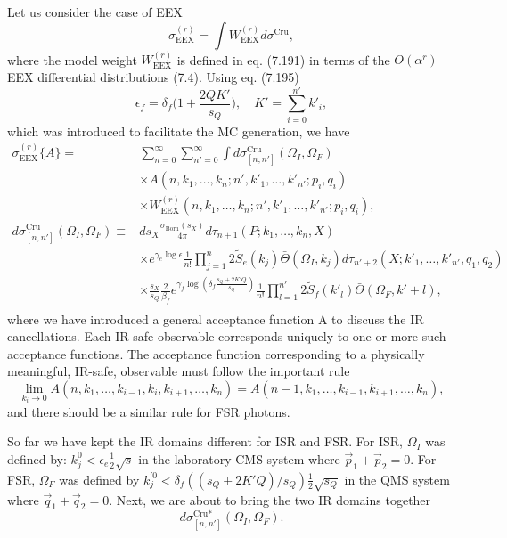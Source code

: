 Let us consider the case of EEX 
\begin{equation}
\sigma^{(r)}_\text{EEX}=\int W^{(r)}_\text{EEX}d\sigma^\text{Cru},
\end{equation}
where the model weight $W^{(r)}_\text{EEX}$ is defined in eq. (7.191) in terms of the $O(\alpha^r)$ EEX differential distributions (7.4). Using eq. (7.195)
\begin{equation}
\epsilon_f=\delta_f\biggl(1+\frac{2QK'}{s_Q}\biggr),\quad K'=\sum_{i=0}^{n'}k'_i,
\end{equation}
which was introduced to facilitate the MC generation, we have
\begin{align}
\sigma^{(r)}_\text{EEX}\{A\}=&\sum_{n=0}^{\infty}\sum_{n'=0}^{\infty}\int d\sigma^\text{Cru}_{[n,n']}(\Omega_I,\Omega_F)\nonumber\\
&\times A(n,k_1,\ldots,k_n;n',k'_1,\ldots,k'_{n'};p_i,q_i)\nonumber\\
&\times W^{(r)}_\text{EEX}(n,k_1,\ldots,k_n;n',k'_1,\ldots,k'_{n'};p_i,q_i),\nonumber\\
d\sigma^\text{Cru}_{[n,n']}(\Omega_I,\Omega_F)\equiv& ds_X\frac{\sigma_\text{Born}(s_X)}{4\pi}d\tau_{n+1}(P;k_1,\ldots,k_n,X)\nonumber\\
&\times e^{\gamma_e\log\epsilon}\frac{1}{n!}\prod_{j=1}^{n}2\widetilde{S}_e(k_j)\bar{\Theta}(\Omega_I,k_j)d\tau_{n'+2}(X;k'_1,\ldots,k'_{n'},q_1,q_2)\nonumber\\
&\times\frac{s_X}{s_Q}\frac{2}{\beta_f}e^{\gamma_f\log\left(\delta_f\frac{s_Q+2K'Q}{s_Q}\right)}\frac{1}{n!}\prod_{l=1}^{n'}2\widetilde{S}_f(k'_l)\bar{\Theta}(\Omega_F,k'+l),\nonumber\\
\end{align}
where we have introduced a general acceptance function A to discuss the IR cancellations. Each IR-safe observable corresponds uniquely to one or more such acceptance functions. 
The acceptance function corresponding to a physically meaningful, IR-safe, observable must follow the important rule 
\begin{equation}
\lim_{k_i\to 0}A(n,k_1,\ldots,k_{i-1},k_i,k_{i+1},\ldots,k_n)=A(n-1,k_1,\ldots,k_{i-1},k_{i+1},\ldots,k_n),
\end{equation}
and there should be a similar rule for FSR photons. 

So far we have kept the IR domains different for ISR and FSR. For ISR, $\Omega_I$ was defined by: $k^0_j<\epsilon_e\frac{1}{2}\sqrt{s}$ in the laboratory CMS system where $\vec{p}_1+\vec{p}_2=0$. For FSR, $\Omega_F$ was defined by $k^{'0}_j<\delta_f((s_Q+2K'Q)/s_Q)\frac{1}{2}\sqrt{s_Q}$ in the QMS system where $\vec{q}_1+\vec{q}_2=0$. Next, we are about to bring the two IR domains together 
\begin{equation}
d\sigma^{\text{Cru}\ast}_{[n,n']}(\Omega_I,\Omega_F).
\end{equation}

